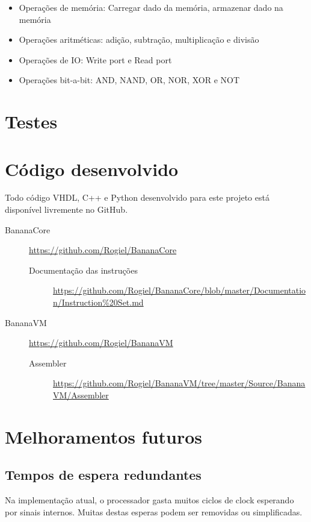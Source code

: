 \documentclass[11pt]{report}
\begin{document}
\begin{itemize}
	\item Operações de memória: Carregar dado da memória, armazenar dado na memória
	\item Operações aritméticas: adição, subtração, multiplicação e divisão
	\item Operações de IO: Write port e Read port
	\item Operações bit-a-bit: AND, NAND, OR, NOR, XOR e NOT
\end{itemize}

\chapter{Testes}

\chapter{Código desenvolvido}
\label{ch:Instruction documentation}
Todo código VHDL, C++ e Python desenvolvido para este projeto está disponível livremente no GitHub.

\begin{description}
	\item[BananaCore] \url{https://github.com/Rogiel/BananaCore}
	\begin{description}
		\item[Documentação das instruções] \url{https://github.com/Rogiel/BananaCore/blob/master/Documentation/Instruction%20Set.md}
	\end{description}
	
	\item[BananaVM] \url{https://github.com/Rogiel/BananaVM}
	\begin{description}
		\item[Assembler] \url{https://github.com/Rogiel/BananaVM/tree/master/Source/BananaVM/Assembler}
	\end{description}
\end{description}

\chapter{Melhoramentos futuros}
\section*{Tempos de espera redundantes}
Na implementação atual, o processador gasta muitos ciclos de clock esperando por sinais internos. Muitas destas esperas podem ser removidas ou simplificadas.
\end{document}

